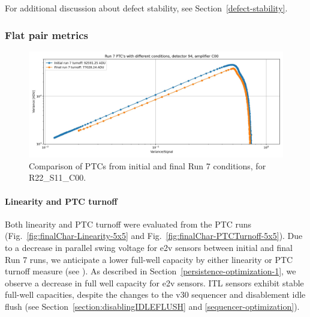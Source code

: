 For additional discussion about defect stability, see Section~\ref{defect-stability}.

\clearpage
\subsubsection{Flat pair metrics}

\begin{figure}[ht]
    \centering
    \includegraphics[width=0.7\linewidth]{figures/finalCharacterization/run7PTCsToDate(3).jpg}
    \caption{Comparison of PTCs from initial and final Run 7 conditions, for R22\_S11\_C00.}
    \label{fig:finalChar-PTCComparison}
\end{figure}
\clearpage

\paragraph{Linearity and PTC turnoff}\label{final-linearity-and-ptc-turnoff}

Both linearity and PTC turnoff were evaluated from the PTC runs (Fig.~\ref{fig:finalChar-Linearity-5x5} and Fig.~\ref{fig:finalChar-PTCTurnoff-5x5}). Due to a decrease in parallel swing voltage for e2v sensors between initial and final Run 7 runs, we anticipate a lower full-well capacity by either linearity or PTC turnoff measure (see \cite{2001sccd.book.....J}). As described in Section~\ref{persistence-optimization-1}, we observe a decrease in full well capacity for e2v sensors. ITL sensors exhibit stable full-well capacities, despite the changes to the v30 sequencer and disablement idle flush (see Section~\ref{section:disablingIDLEFLUSH} and \ref{sequencer-optimization}).

